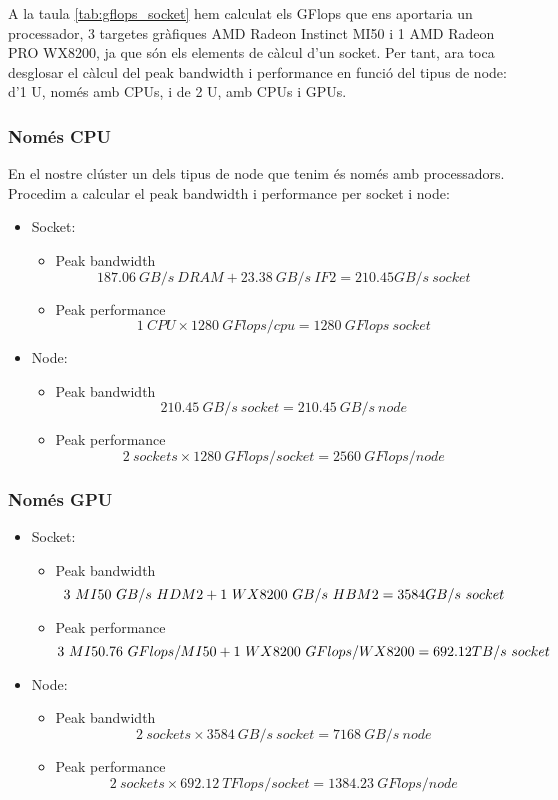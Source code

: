 A la taula \ref{tab:gflops_socket} hem calculat els GFlops que ens aportaria un processador, 3 targetes gràfiques AMD Radeon Instinct MI50 i 1 AMD Radeon PRO WX8200, ja que són els elements de càlcul d'un socket. Per tant, ara toca desglosar el càlcul del peak bandwidth i performance en funció del tipus de node: d'1 U, només amb CPUs, i de 2 U, amb CPUs i GPUs.

\subsubsection{Només CPU}
En el nostre clúster un dels tipus de node que tenim és només amb processadors. Procedim a calcular el peak bandwidth i performance per socket i node:

\begin{itemize}
    \item Socket:
        \begin{itemize}
            \item Peak bandwidth
                \[187.06\ GB/s\ DRAM + 23.38\ GB/s\ IF2 = 210.45 GB/s\ socket\]
            \item Peak performance
        \[ 1\ CPU \times 1280\ GFlops/cpu = 1280\ GFlops\ socket\]
        \end{itemize}
    \item Node:
        \begin{itemize}
            \item Peak bandwidth
                \[210.45\ GB/s\ socket = 210.45\ GB/s\ node\]
            \item Peak performance
\[2\ sockets \times 1280\ GFlops/socket = 2560\ GFlops/node\]
        \end{itemize}
\end{itemize}

\subsubsection{Només GPU}

\begin{itemize}
    \item Socket:
        \begin{itemize}
            \item Peak bandwidth
                \[3\ MI50 \time 1024\ GB/s\ HDM2 + 1\ WX8200 \time 512\ GB/s\ HBM2 = 3584 GB/s\ socket\]
            \item Peak performance
                \[3\ MI50 \time 20597.76\ GFlops/MI50 + 1\ WX8200 \time 672\ GFlops/WX8200 = 692.12 TB/s\ socket\]
        \end{itemize}
    \item Node:
        \begin{itemize}
            \item Peak bandwidth
                \[2\ sockets \times 3584\ GB/s\ socket = 7168\ GB/s\ node\]
            \item Peak performance
\[2\ sockets \times 692.12\ TFlops/socket = 1384.23\ GFlops/node\]
        \end{itemize}
\end{itemize}

